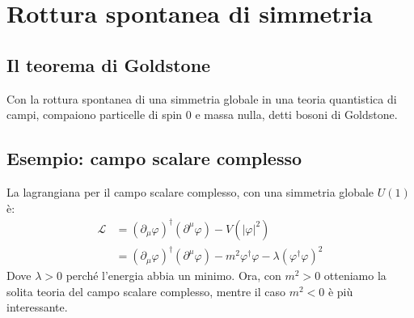 \documentclass[italian,a4paper]{article}
\theoremstyle{definition}
\newcommand{\lagr}{\ensuremath{\mathscr{L}}}
\begin{document}
\section{Rottura spontanea di simmetria}
\subsection{Il teorema di Goldstone}\label{goldstone}
Con la rottura spontanea di una simmetria globale in una teoria quantistica
di campi, compaiono particelle di spin $0$ e massa nulla, detti bosoni di
Goldstone.
\subsection*{Esempio: campo scalare complesso}
La lagrangiana per il campo scalare complesso, con una simmetria globale
$U(1)$ \`e:
\begin{align*}
    \lagr &= (\partial_\mu \varphi)^\dagger (\partial^\mu \varphi) -
    V(|\varphi|^2)\\
    &= (\partial_\mu \varphi)^\dagger (\partial^\mu \varphi) -
    m^2\varphi^\dagger\varphi - \lambda (\varphi^\dagger \varphi)^2
\end{align*}
Dove $\lambda > 0$ perch\'e l'energia abbia un minimo. Ora, con $m^2 > 0$
otteniamo la solita teoria del campo scalare complesso, mentre il caso
$m^2 < 0$ \`e pi\`u interessante.
\end{document}
